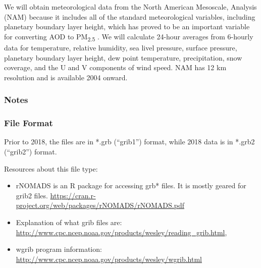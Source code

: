We will obtain meteorological data from the North American Mesoscale, Analysis (NAM) because it includes all of the standard meteorological variables, including planetary boundary layer height, which has proved to be an important variable for converting AOD to PM\textsubscript{2.5} \citep{liu_estimating_2005}. We will calculate 24-hour averages from 6-hourly data for temperature, relative humidity, sea livel pressure, surface pressure, planetary boundary layer height, dew point temperature, precipitation, snow coverage, and the U and V components of wind speed. NAM has 12 km resolution and is available 2004 onward.

\subsubsection*{Notes}


\subsubsection*{File Format}

Prior to 2018, the files are in *.grb (``grib1'') format, while 2018 data is in *.grb2 (``grib2'') format.

Resources about this file type: 
\begin{itemize}
\item rNOMADS is an R package for accessing grb* files. It is mostly geared for grib2 files. \url{https://cran.r-project.org/web/packages/rNOMADS/rNOMADS.pdf}
\item Explanation of what grib files are: \url{http://www.cpc.ncep.noaa.gov/products/wesley/reading_grib.html}, 
\item wgrib program information: \url{http://www.cpc.ncep.noaa.gov/products/wesley/wgrib.html}

\end{itemize}


